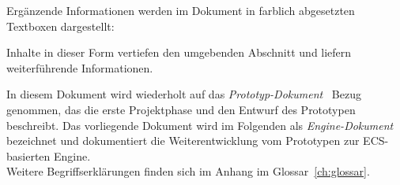 Ergänzende Informationen werden im Dokument in farblich abgesetzten Textboxen dargestellt:

\vspace{5mm}
\begin{tcolorbox}[colback=black!5, colframe=black, title={Beispiel}]
    Inhalte in dieser Form vertiefen den umgebenden Abschnitt und liefern weiterführende Informationen.
\end{tcolorbox}
\vspace{5mm}

In diesem Dokument wird wiederholt auf das \textit{Prototyp-Dokument}~\cite{SH25} Bezug genommen, das die erste Projektphase und den Entwurf des Prototypen beschreibt.
Das vorliegende Dokument wird im Folgenden als \textit{Engine-Dokument} bezeichnet und dokumentiert die Weiterentwicklung vom Prototypen zur ECS-basierten Engine.\\


Weitere Begriffserklärungen finden sich im Anhang im Glossar~\ref{ch:glossar}.